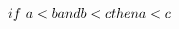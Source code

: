 \documentclass[preview]{standalone}
\begin{document}
\begin{center}
$if\ a < b \vspace{2cm}  and  \vspace{2cm} b < c \vspace{2cm} then \vspace{2cm} a < c$
\end{center}
\end{document}
